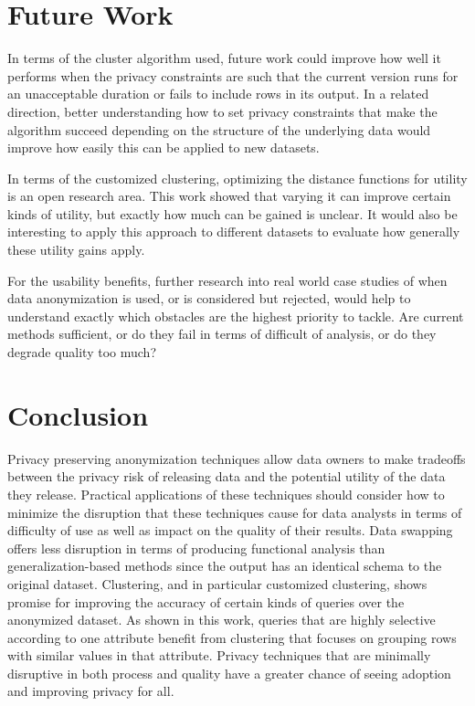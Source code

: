 \section{Future Work}
In terms of the cluster algorithm used, future work could improve how well it performs when the privacy constraints are such that the current version runs for an unacceptable duration or fails to include rows in its output. In a related direction, better understanding how to set privacy constraints that make the algorithm succeed depending on the structure of the underlying data would improve how easily this can be applied to new datasets.

In terms of the customized clustering, optimizing the distance functions for utility is an open research area. This work showed that varying it can improve certain kinds of utility, but exactly how much can be gained is unclear. It would also be interesting to apply this approach to different datasets to evaluate how generally these utility gains apply.

For the usability benefits, further research into real world case studies of when data anonymization is used, or is considered but rejected, would help to understand exactly which obstacles are the highest priority to tackle. Are current methods sufficient, or do they fail in terms of difficult of analysis, or do they degrade quality too much?

\section{Conclusion}
Privacy preserving anonymization techniques allow data owners to make tradeoffs between the privacy risk of releasing data and the potential utility of the data they release. Practical applications of these techniques should consider how to minimize the disruption that these techniques cause for data analysts in terms of difficulty of use as well as impact on the quality of their results. Data swapping offers less disruption in terms of producing functional analysis than generalization-based methods since the output has an identical schema to the original dataset. Clustering, and in particular customized clustering, shows promise for improving the accuracy of certain kinds of queries over the anonymized dataset. As shown in this work, queries that are highly selective according to one attribute benefit from clustering that focuses on grouping rows with similar values in that attribute. Privacy techniques that are minimally disruptive in both process and quality have a greater chance of seeing adoption and improving privacy for all.



% 






